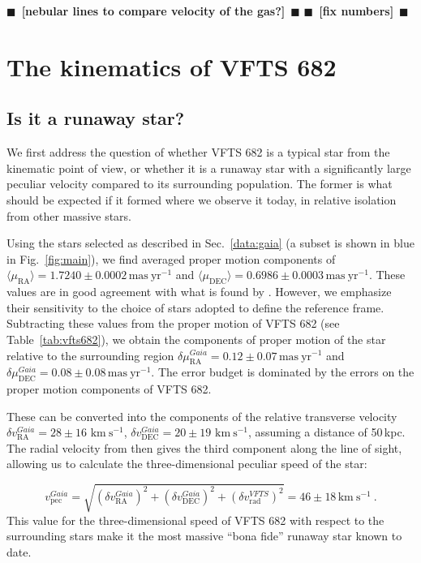 \documentclass[apjl,twocolumn]{emulateapj}
\newcommand{\todo}[1]{{\large $\blacksquare$~\textbf{\color{red}[#1]}}~$\blacksquare$}
\newcommand{\kms}{{\,\mathrm{km\ s^{-1}}}}
\DeclareRobustCommand{\Figref}[1]{Fig.~\ref{#1}}
\DeclareRobustCommand{\Tabref}[1]{Table~\ref{#1}}
\DeclareRobustCommand{\Secref}[1]{Sec.~\ref{#1}}
\begin{document}
\todo{nebular lines to compare velocity of the gas?}
\todo{fix numbers}

\section{The kinematics of VFTS 682}
\label{sec:results}

\subsection{Is it a runaway star?}
\label{sec:runaway}
We first address the question of whether VFTS 682 is a typical star
from the kinematic point of view, or whether it is a runaway star with
a significantly large peculiar velocity compared to its surrounding population. The former is what should
be expected if it formed where we observe it today, in relative
isolation from other massive stars.

Using the stars selected as described in \Secref{data:gaia} (a
subset is shown in blue in \Figref{fig:main}), we find averaged proper motion components of
$\langle\mu_\mathrm{RA}\rangle = 1.7240\pm0.0002\,\mathrm{mas\ yr^{-1}}$ and
$\langle\mu_\mathrm{DEC}\rangle = 0.6986\pm0.0003\,\mathrm{mas\
  yr^{-1}}$. These values are
in good agreement with what is found by \cite{lennon:18}. However, we
emphasize their sensitivity to the choice of stars adopted to define
the reference frame. Subtracting these values from the
proper motion of VFTS 682 (see \Tabref{tab:vfts682}), we obtain the
components of proper motion of the star relative to the surrounding region
$\delta\mu_\mathrm{RA}^{Gaia} = 0.12\pm 0.07\,\mathrm{mas\ yr^{-1}}$ and $\delta\mu_\mathrm{DEC}^{Gaia} =
0.08\pm 0.08\,\mathrm{mas\ yr^{-1}}$. The error budget is
dominated by the errors on the proper motion components of VFTS 682.

These can be converted into
the components of the relative transverse velocity $\delta v_\mathrm{RA}^{Gaia}=28\pm16\,\kms$,
$\delta v_\mathrm{DEC}^{Gaia}=20\pm19\,\kms$, assuming a distance of
50\,kpc. %
The radial velocity from
\cite{bestenlehner:11} then gives the third component along
the line of sight, allowing us to calculate the three-dimensional
peculiar speed of the star:

\begin{equation}
  \label{eq:speed_around}
  v_\mathrm{pec}^{Gaia} = \sqrt{\left(\delta v_\mathrm{RA}^{Gaia}\right)^2
    +\left(\delta v_\mathrm{DEC}^{Gaia}\right)^2+\left(\delta
      v_\mathrm{rad}^{VFTS}\right)^2} = 46 \pm 18 
  \kms \ .
\end{equation}
This value for the three-dimensional speed of VFTS 682 with respect to
the surrounding stars make it the most massive ``bona fide'' runaway star
known to date.
\end{document}
